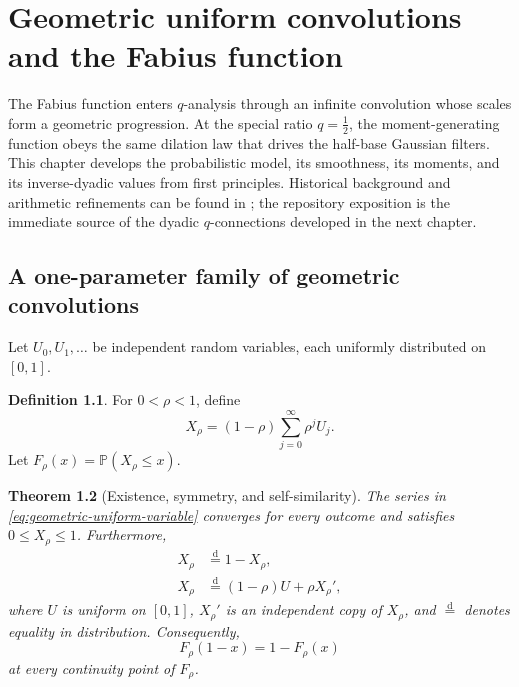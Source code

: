 \documentclass[11pt,oneside,openany]{book}
\newtheorem{theorem}{Theorem}[chapter]
\theoremstyle{definition}
\newtheorem{definition}[theorem]{Definition}
\theoremstyle{remark}
\newcommand{\Prob}{\mathbb P}
\begin{document}
\chapter{Geometric uniform convolutions and the Fabius function}\label{chap:fabius-probability}

The Fabius function enters $q$-analysis through an infinite convolution whose scales form a geometric progression.  At the special ratio $q=\tfrac12$, the moment-generating function obeys the same dilation law that drives the half-base Gaussian filters.  This chapter develops the probabilistic model, its smoothness, its moments, and its inverse-dyadic values from first principles.  Historical background and arithmetic refinements can be found in \cite{JessenWintner1935,Fabius1966,AriasDeReyna2018}; the repository exposition \cite{ReshetnikovProveIt2026} is the immediate source of the dyadic $q$-connections developed in the next chapter.

\section{A one-parameter family of geometric convolutions}

Let $U_0,U_1,\ldots$ be independent random variables, each uniformly distributed on $[0,1]$.

\begin{definition}
For $0<\rho<1$, define
\begin{equation}
 X_\rho=(1-\rho)\sum_{j=0}^{\infty}\rho^jU_j.\label{eq:geometric-uniform-variable}
\end{equation}
Let $F_\rho(x)=\Prob(X_\rho\le x)$.
\end{definition}

\begin{theorem}[Existence, symmetry, and self-similarity]\label{thm:geometric-uniform-basic}
The series in \eqref{eq:geometric-uniform-variable} converges for every outcome and satisfies $0\le X_\rho\le1$.  Furthermore,
\begin{align}
 X_\rho&\mathrel{\overset{\mathrm d}{=}}1-X_\rho,\label{eq:geometric-uniform-symmetry}\\
 X_\rho&\mathrel{\overset{\mathrm d}{=}}(1-\rho)U+\rho X_\rho',\label{eq:geometric-uniform-fixedpoint}
\end{align}
where $U$ is uniform on $[0,1]$, $X_\rho'$ is an independent copy of $X_\rho$, and $\overset{\mathrm d}{=}$ denotes equality in distribution.  Consequently,
\[
 F_\rho(1-x)=1-F_\rho(x)
\]
at every continuity point of $F_\rho$.
\end{theorem}
\end{document}
